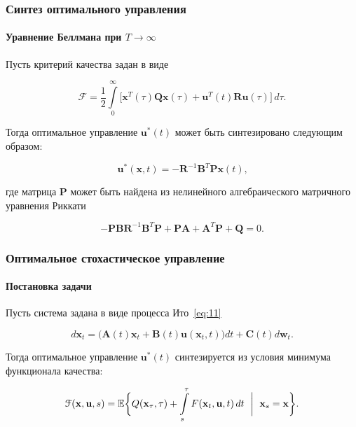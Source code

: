 \documentclass[ignorenonframetext,hyperref={pdftex,unicode},compress]{beamer}
\begin{document}
\begin{frame}
	\frametitle{Синтез оптимального управления}
	\framesubtitle{Уравнение Беллмана при $T \to \infty$}

    Пусть критерий качества задан в виде
    
    \begin{equation}\label{eq:8}
    	\mathcal{F} = \frac{1}{2} \int\limits_0^\infty \bigl[ \mathbf{x}^T(\tau)\mathbf{Q} \mathbf{x}(\tau) + \mathbf{u}^T(t)\mathbf{R} \mathbf{u}(\tau) \bigr]\,d\tau \text{.}
    \end{equation}
    
    Тогда оптимальное управление $\mathbf{u}^*(t)$ может быть синтезировано следующим образом:
    
    \begin{equation}\label{eq:9}
    	\mathbf{u}^*(\mathbf{x}, t) = -\mathbf{R}^{-1}\mathbf{B}^T\mathbf{P}\mathbf{x}(t) \text{,}
    \end{equation}
    
    где матрица $\mathbf{P}$ может быть найдена из нелинейного алгебраического матричного уравнения Риккати
    
    \begin{equation}\label{eq:10}
    	-\mathbf{P}\mathbf{B}\mathbf{R}^{-1}\mathbf{B}^T\mathbf{P} + \mathbf{P}\mathbf{A} + \mathbf{A}^T\mathbf{P} + \mathbf{Q} = 0 \text{.}    
    \end{equation}
\end{frame}



\begin{frame}
	\frametitle{Оптимальное стохастическое управление}
	\framesubtitle{Постановка задачи}
    
    Пусть система задана в виде процесса Ито~\ref{eq:11}

    \begin{equation}\label{eq:11}
    	d\mathbf{x}_t = \bigl( \mathbf{A}(t)\mathbf{x}_t + \mathbf{B}(t)\mathbf{u}(\mathbf{x}_t, t) \bigr)dt + \mathbf{C}(t)d\mathbf{w}_t \text{.}
    \end{equation}
    
    Тогда оптимальное управление $\mathbf{u}^*(t)$ синтезируется из условия минимума функционала качества:
    
    \begin{equation}\label{eq:12}
    	\mathcal{F}(\mathbf{x}, \mathbf{u}, s) = \mathbb{E} \biggl\{ Q(\mathbf{x}_\tau, \tau) + \int\limits_s^\tau F(\mathbf{x}_t, \mathbf{u}, t)\,dt~\biggm|~ \mathbf{x}_s = \mathbf{x} \biggr\} \text{.}
    \end{equation}
\end{frame}
\end{document}
